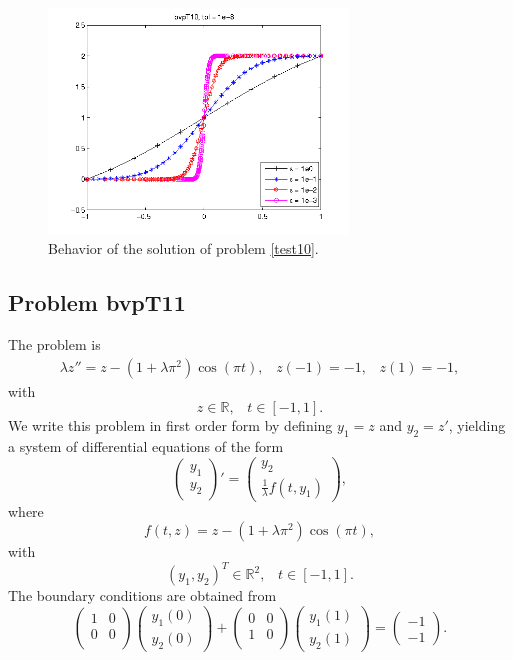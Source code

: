 \documentclass[<options>]{article}
\def \RR {{\mathbb{R}}}
\begin{document}
\begin{figure}[htb]
\centerline{\includegraphics[height=6cm]{Prob10}}
\caption{Behavior of the solution of problem \ref{test10}.}
\end{figure}
\newpage
\subsection{Problem bvpT11}\label{test11}
The problem is 
\begin{eqnarray*}
\lambda z'' =  z -(1 +\lambda \pi^{2}) \cos(\pi t), \;\;\;z(-1) = -1, \;\;\; z(1) = -1,
\end{eqnarray*}
with
\[
z \in \RR, \;\;\; t\in [-1,1].
\]
We write this problem in first order form by defining $y_1=z$ and $y_2=z'$, yielding a system of differential equations of the form
\begin{equation*}
\left(\begin{array}{c}
y_1\\
y_2
\end{array}\right)'=
\left(\begin{array}{c}
y_2\\
\frac{1}{\lambda}f(t,y_1)
\end{array}\right),
\end{equation*}
where
\begin{equation*}
f(t,z) =  z -(1 +\lambda \pi^{2}) \cos(\pi t),
\end{equation*}
with
\[
(y_1,y_2)^T \in \RR^{2}, \;\;\;  t \in [-1,1].
\]
The  boundary conditions are obtained from
\begin{equation*}
\left(
  \begin{array}{cc}
    1 & 0 \\
    0 & 0 \\
  \end{array}
\right)
\left(\begin{array}{c}
y_{1}(0)\\
y_{2}(0)
\end{array}\right)
+
\left(
  \begin{array}{cc}
    0 & 0 \\
    1 & 0 \\
  \end{array}
\right)
\left(\begin{array}{c}
y_{1}(1)\\
y_{2}(1)
\end{array}\right)=\left(\begin{array}{c}
-1 \\
-1
\end{array}\right).
\end{equation*}
\end{document}
